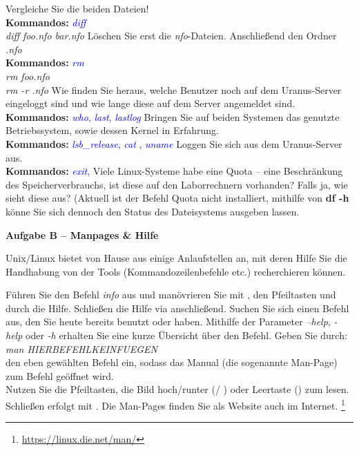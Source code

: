 \documentclass[paper=a4,fontsize=11pt]{scrartcl}%
\numberwithin{equation}{section}
\begin{document}
{\begin{enumerate}
\begin{tasks}
\begin{itemize}
          \end{itemize}
          \task Vergleiche Sie die beiden Dateien!\\
          \textbf{Kommandos:} \textcolor{blue}{\emph{diff}}\\
          \textit{diff foo.nfo bar.nfo}
          \task Löschen Sie erst die \emph{nfo}-Dateien. Anschließend den Ordner \emph{.nfo}\\
          \textbf{Kommandos:} \textcolor{blue}{\emph{rm}}\\
          \textit{rm foo.nfo}\\
          \textit{rm -r .nfo}
          \task Wie finden Sie heraus, welche Benutzer noch auf dem Uranus-Server eingeloggt sind und wie lange diese auf dem Server angemeldet sind.\\
          \textbf{Kommandos:} \textcolor{blue}{\emph{who}, \emph{last}, \emph{lastlog}}
          \task Bringen Sie auf beiden Systemen das genutzte Betriebssystem, sowie dessen Kernel in Erfahrung.\\
          \textbf{Kommandos:} \textcolor{blue}{\emph{lsb\_release}, \emph{cat }, \emph{uname}}
          \task Loggen Sie sich aus dem Uranus-Server aus.\\
          \textbf{Kommandos:} \textcolor{blue}{\emph{exit}, }
          \task Viele Linux-Systeme habe eine Quota -- eine Beschränkung des Speicherverbrauchs, ist diese auf den Laborrechnern vorhanden? Falls ja, wie sieht diese aus? (Aktuell ist der Befehl Quota nicht installiert, mithilfe von \textbf{df -h} könne Sie sich dennoch den Status des Dateisystems ausgeben lassen.
        \end{tasks}
\end{enumerate}

\begin{center}\Large{\textbf{Aufgabe B -- Manpages \& Hilfe}}\end{center}\vskip0.25in
Unix/Linux bietet von Hause aus einige Anlaufstellen an, mit deren Hilfe Sie die Handhabung von der Tools (Kommandozeilenbefehle etc.) recherchieren können.
\begin{tasks}
	\task Führen Sie den Befehl \emph{info} aus und manövrieren Sie mit \keys{\tab}, den Pfeiltasten und \keys{\return} durch die Hilfe. Schließen die Hilfe via  anschließend.
	\task Suchen Sie sich einen Befehl aus, den Sie heute bereits benutzt oder haben. Mithilfe der Parameter \emph{--help}, \emph{-help} oder \emph{-h} erhalten Sie eine kurze Übersicht über den Befehl.
    \task Geben Sie durch: \\
    		\emph{man HIERBEFEHLKEINFUEGEN}\\
		den eben gewählten Befehl ein, sodass das Manual (die sogenannte Man-Page) zum Befehl geöffnet wird.\\
		 Nutzen Sie die Pfeiltasten, die Bild hoch/runter (/ ) oder Leertaste (\keys{\Space}) zum lesen. Schließen erfolgt mit .
		\task Die Man-Pages finden Sie als Website auch im Internet. \footnote{\url{https://linux.die.net/man/}}
\end{tasks}

}
\end{document}
